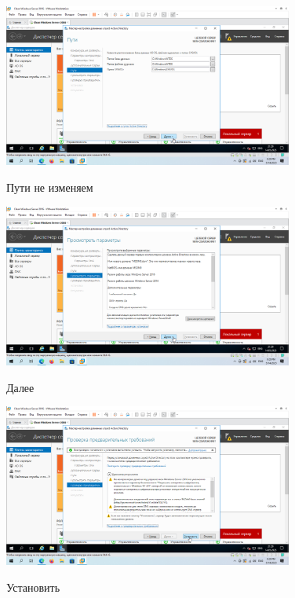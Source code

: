 \documentclass[a4paper]{article}
\begin{document}
  \begin{figure}[H]
    \centering
    \includegraphics[width=0.85\textwidth]{5_0049}
    \label{img:49}
    \caption{Пути не изменяем}
  \end{figure}

  \begin{figure}[H]
    \centering
    \includegraphics[width=0.85\textwidth]{5_0050}
    \label{img:50}
    \caption{Далее}
  \end{figure}

  \begin{figure}[H]
    \centering
    \includegraphics[width=0.85\textwidth]{5_0051}
    \label{img:51}
    \caption{Установить}
  \end{figure}
\end{document}
